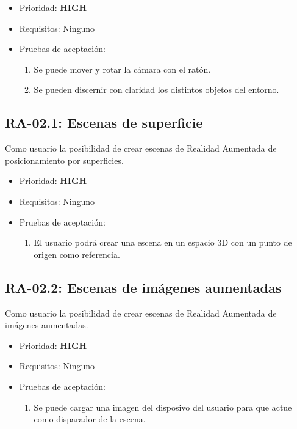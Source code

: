 \begin{itemize}
    \item Prioridad: \textbf{HIGH}
    \item Requisitos: Ninguno
    \item Pruebas de aceptación:
			\begin{enumerate}
				\item Se puede mover y rotar la cámara con el ratón.
				\item Se pueden discernir con claridad los distintos objetos del entorno.
			\end{enumerate}
\end{itemize}

\subsection{RA-02.1: Escenas de superficie}
Como usuario la posibilidad de crear escenas de Realidad Aumentada de posicionamiento por superficies.

\begin{itemize}
    \item Prioridad: \textbf{HIGH}
    \item Requisitos: Ninguno
    \item Pruebas de aceptación:
	\begin{enumerate}
		\item El usuario podrá crear una escena en un espacio 3D con un punto de origen como referencia.
	\end{enumerate}
\end{itemize}

\subsection{RA-02.2: Escenas de imágenes aumentadas}
Como usuario la posibilidad de crear escenas de Realidad Aumentada de imágenes aumentadas.

\begin{itemize}
    \item Prioridad: \textbf{HIGH}
    \item Requisitos: Ninguno
    \item Pruebas de aceptación:
	\begin{enumerate}
		\item Se puede cargar una imagen del disposivo del usuario para que actue como disparador de la escena.
	\end{enumerate}
\end{itemize}

